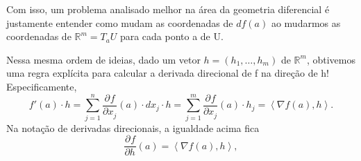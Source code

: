 \documentclass[../analysisII_notes.tex]{subfiles}
\begin{document}
Com isso, um problema analisado melhor na área da geometria diferencial é justamente entender como mudam as coordenadas de \(df(a)\) ao mudarmos as coordenadas de \(\mathbb{R}^{m} = T_{a}U\) para cada ponto a de U.
\begin{tcolorbox}[
		skin=enhanced,
		title=Observação,
		fonttitle=\bfseries,
		colframe=black,
		colbacktitle=cyan!75!white,
		colback=cyan!15,
		colbacklower=black,
		coltitle=black,
		drop fuzzy shadow,
	]
	Nessa mesma ordem de ideias, dado um vetor \(h=(h_1, \dotsc , h_{m})\) de \(\mathbb{R}^{m}\), obtivemos uma regra explícita para calcular a derivada direcional de f na direção de h! Especificamente,
	\[
		f'(a)\cdot h = \sum\limits_{j=1}^{n}\frac{\partial^{}f}{\partial x_{j}^{}}(a)\cdot dx_{j}\cdot h = \sum\limits_{j=1}^{m}\frac{\partial^{}f}{\partial x_{j}^{}}(a)\cdot h_{j} = \left< \nabla f(a), h \right>.
	\]
	Na notação de derivadas direcionais, a igualdade acima fica
	\[
		\frac{\partial^{}f}{\partial h^{}}(a) = \left< \nabla f(a), h \right>,
	\]
\end{tcolorbox}
\end{document}

